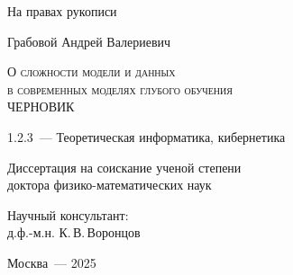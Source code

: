 \thispagestyle{empty}


\begin{titlepage}
\begin{center}
\end{center}
\vspace{1.5cm}
\begin{flushright}
{На правах рукописи}
\end{flushright}
\vspace{1.5cm}
\begin{center}
{Грабовой Андрей Валериевич}
\par
\vspace{2cm}
\textsc{О сложности модели и данных \\ в современных моделях глубого обучения}\\
\textsc{ЧЕРНОВИК}
\par
\vspace{2cm}
{1.2.3~--- Теоретическая информатика, кибернетика}
\par
\vspace{2cm}
{Диссертация на соискание ученой степени\\
доктора физико-математических наук}
\end{center}
\vspace{2cm}
\hfill\parbox{8,4cm}{Научный консультант:
\\д.ф.-м.н. К.\,В.\,Воронцов}
\par
\vspace{3.5cm}
\begin{center}
{Москва~--- 2025}
\end{center}
\end{titlepage}